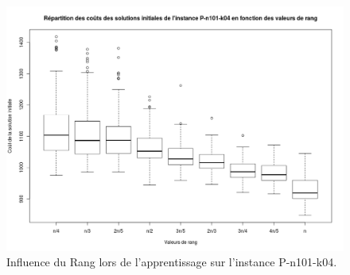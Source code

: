 \documentclass[a4paper,11pt]{article}%
\begin{document}
\begin{figure}[p]
        \centering
        \includegraphics[scale=0.32]{InfluenceRangP10104}
        
        \caption{Influence du Rang lors de l'apprentissage sur l'instance P-n101-k04.}
        \label{InfRP10104}

\end{figure}
 
\end{document}
